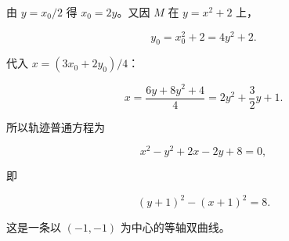 \begin{answer}

由 $y=x_0/2$ 得 $x_0=2y$。又因 $M$ 在
$y=x^2+2$ 上，

\nopagebreak[4]
\[
y_0=x_0^2+2=4y^2+2.
\]

代入 $x=(3x_0+2y_0)/4$：

\nopagebreak[4]
\[
x=\frac{6y+8y^2+4}{4}
=2y^2+\frac32y+1.
\]

所以轨迹普通方程为

\nopagebreak[4]
\[
x^2-y^2+2x-2y+8=0,
\]

即

\nopagebreak[4]
\[
(y+1)^2-(x+1)^2=8.
\]

这是一条以 $(-1,-1)$ 为中心的等轴双曲线。




\end{answer}